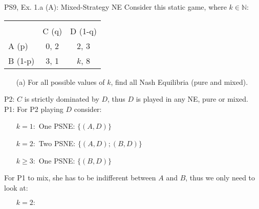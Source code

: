\begin{frame}{PS9, Ex. 1.a (A): Mixed-Strategy NE}
      Consider this static game, where $k\in\mathbb{N}:$
      \vspace{-16pt}
      \begin{table}
        \begin{tabular}{l|c|c|}
          \multicolumn{1}{c}{} & \multicolumn{2}{c}{} \\
          \multicolumn{1}{c}{} & \multicolumn{1}{c}{C (q)} & \multicolumn{1}{c}{\color{blue}D (1-q)} \\\cline{2-3}
          A (p)   & 0, 2 & 2, \color{blue}3 \\\cline{2-3}
          B (1-p) & 3, 1 & $k$, \color{blue}8 \\\cline{2-3}
        \end{tabular}
      \end{table}
      \begin{itemize}
        \item[(a)] For all possible values of $k$, find all Nash Equilibria (pure and mixed).
      \end{itemize}
      P2: $C$ is strictly dominated by $D$, thus $D$ is played in any NE, pure or mixed.\\\medskip
      P1: For P2 playing $D$ consider:
      \begin{itemize}
        \item[$k=1:$] One PSNE: $\{(A,D)\}$
        \item[$k=2:$] Two PSNE: $\{(A,D);(B,D)\}$
        \item[$k\geq3:$] One PSNE: $\{(B,D)\}$
      \end{itemize}
      For P1 to mix, she has to be indifferent between $A$ and $B$, thus we only need to look at:
      \begin{itemize}
        \item[$k=2:$]
      \end{itemize}
      \vfill\null
\end{frame}

